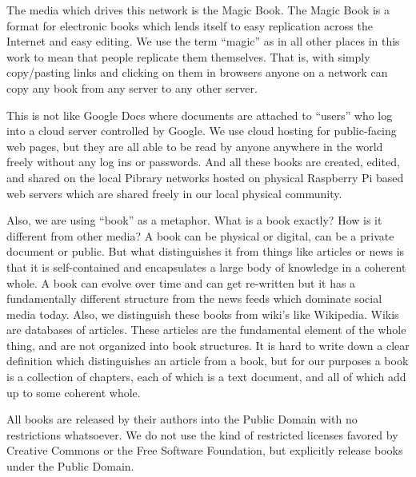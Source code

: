 

The media which drives this network is the Magic Book. The Magic Book is
a format for electronic books which lends itself to easy replication
across the Internet and easy editing. We use the term ``magic'' as in
all other places in this work to mean that people replicate them
themselves. That is, with simply copy/pasting links and clicking on them
in browsers anyone on a network can copy any book from any server to any
other server.

This is not like Google Docs where documents are attached to ``users''
who log into a cloud server controlled by Google. We use cloud hosting
for public-facing web pages, but they are all able to be read by anyone
anywhere in the world freely without any log ins or passwords. And all
these books are created, edited, and shared on the local Pibrary
networks hosted on physical Raspberry Pi based web servers which are
shared freely in our local physical community.

Also, we are using ``book'' as a metaphor. What is a book exactly? How
is it different from other media? A book can be physical or digital, can
be a private document or public. But what distinguishes it from things
like articles or news is that it is self-contained and encapsulates a
large body of knowledge in a coherent whole. A book can evolve over time
and can get re-written but it has a fundamentally different structure
from the news feeds which dominate social media today. Also, we
distinguish these books from wiki's like Wikipedia. Wikis are databases
of articles. These articles are the fundamental element of the whole
thing, and are not organized into book structures. It is hard to write
down a clear definition which distinguishes an article from a book, but
for our purposes a book is a collection of chapters, each of which is a
text document, and all of which add up to some coherent whole.

All books are released by their authors into the Public Domain with no
restrictions whatsoever. We do not use the kind of restricted licenses
favored by Creative Commons or the Free Software Foundation, but
explicitly release books under the Public Domain.

